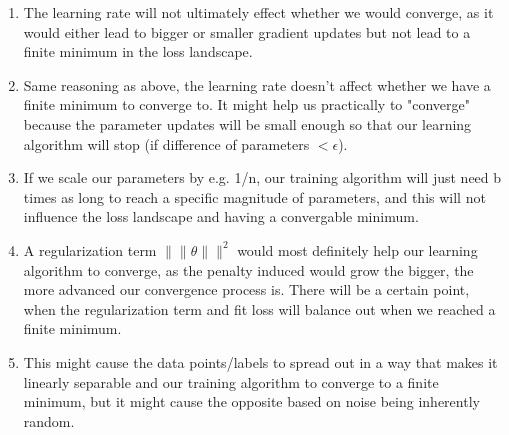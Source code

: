 \begin{answer}
    \begin{enumerate}
        \item The learning rate will not ultimately effect whether we would converge, as it would either lead to bigger or smaller gradient updates but not lead to a finite minimum in the loss landscape. 
    
        \item Same reasoning as above, the learning rate doesn't affect whether we have a finite minimum to converge to. It might help us practically to "converge" because the parameter updates will be small enough so that our learning algorithm will stop (if difference of parameters \(< \epsilon\)).
    
        \item If we scale our parameters by e.g. 1/n, our training algorithm will just need b times as long to reach a specific magnitude of parameters, and this will not influence the loss landscape and having a convergable minimum.
    
        \item A regularization term \(\|\|\theta\|\|^2\) would most definitely help our learning algorithm to converge, as the penalty induced would grow the bigger, the more advanced our convergence process is. There will be a certain point, when the regularization term and fit loss will balance out when we reached a finite minimum.
    
        \item This might cause the data points/labels to spread out in a way that makes it linearly separable and our training algorithm to converge to a finite minimum, but it might cause the opposite based on noise being inherently random.
    \end{enumerate}
    
    \vspace{2em}
\end{answer}
